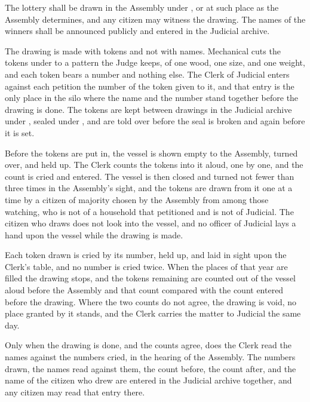 \begin{clauses}
\item The lottery shall be drawn in the Assembly under , or at such place as the Assembly determines, and any citizen may witness the drawing. The names of the winners shall be announced publicly and entered in the Judicial archive.
\item The drawing is made with tokens and not with names. Mechanical cuts the tokens under  to a pattern the Judge keeps, of one wood, one size, and one weight, and each token bears a number and nothing else. The Clerk of Judicial enters against each petition the number of the token given to it, and that entry is the only place in the silo where the name and the number stand together before the drawing is done. The tokens are kept between drawings in the Judicial archive under , sealed under , and are told over before the seal is broken and again before it is set.
\item Before the tokens are put in, the vessel is shown empty to the Assembly, turned over, and held up. The Clerk counts the tokens into it aloud, one by one, and the count is cried and entered. The vessel is then closed and turned not fewer than three times in the Assembly's sight, and the tokens are drawn from it one at a time by a citizen of majority chosen by the Assembly from among those watching, who is not of a household that petitioned and is not of Judicial. The citizen who draws does not look into the vessel, and no officer of Judicial lays a hand upon the vessel while the drawing is made.
\item Each token drawn is cried by its number, held up, and laid in sight upon the Clerk's table, and no number is cried twice. When the places of that year are filled the drawing stops, and the tokens remaining are counted out of the vessel aloud before the Assembly and that count compared with the count entered before the drawing. Where the two counts do not agree, the drawing is void, no place granted by it stands, and the Clerk carries the matter to Judicial the same day.
\item Only when the drawing is done, and the counts agree, does the Clerk read the names against the numbers cried, in the hearing of the Assembly. The numbers drawn, the names read against them, the count before, the count after, and the name of the citizen who drew are entered in the Judicial archive together, and any citizen may read that entry there.

\end{clauses}

